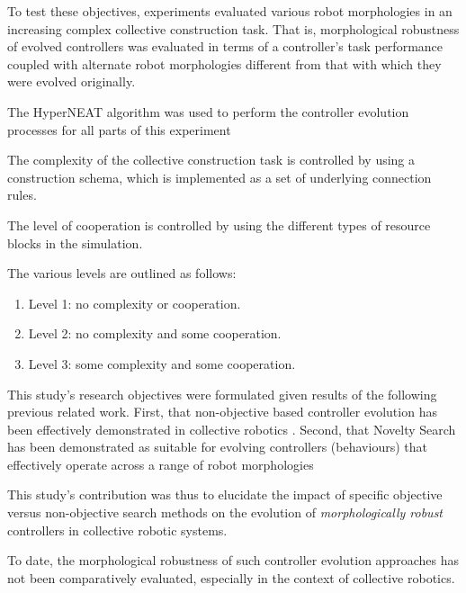 
To test these objectives, experiments evaluated various robot morphologies in an increasing complex collective construction task. 
That is, morphological robustness of evolved controllers was evaluated in terms of a controller's task performance coupled with alternate robot morphologies different from that with which they were evolved originally.

The HyperNEAT algorithm \cite{StanleyDAmbrosioGauci2009} was used to perform the controller evolution processes for all parts of this experiment

The complexity of the collective construction task is controlled by using a construction schema, which is implemented as a set of underlying connection rules. 

The level of cooperation is controlled by using the different types of resource blocks in the simulation.

The various levels are outlined as follows:
\begin{enumerate}
	\item Level 1: no complexity or cooperation.
	\item Level 2: no complexity and some cooperation.
	\item Level 3: some complexity and some cooperation.
\end{enumerate}

This study's research objectives were formulated given results of the following previous related work. First, that non-objective based controller evolution has been effectively demonstrated in collective robotics \cite{RefWorks:11, gomes2013generic, RefWorks:5}.
Second, that Novelty Search has been demonstrated as suitable for evolving controllers (behaviours) that effectively operate across a range of robot morphologies



This study's contribution was thus to elucidate the impact of specific objective versus non-objective search methods on the evolution of \textit{morphologically robust} controllers in collective robotic systems. 

To date, the morphological robustness of such controller evolution approaches has not been comparatively evaluated, especially in the context of collective robotics. 


